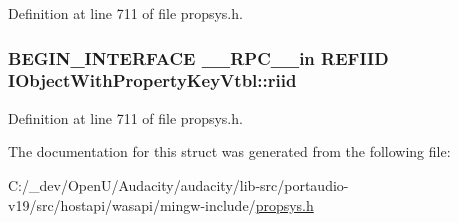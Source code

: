 Definition at line 711 of file propsys.\+h.

\subsubsection[{\texorpdfstring{riid}{riid}}]{\setlength{\rightskip}{0pt plus 5cm}B\+E\+G\+I\+N\+\_\+\+I\+N\+T\+E\+R\+F\+A\+CE {\bf \+\_\+\+\_\+\+R\+P\+C\+\_\+\+\_\+in} {\bf R\+E\+F\+I\+ID} I\+Object\+With\+Property\+Key\+Vtbl\+::riid}\hypertarget{struct_i_object_with_property_key_vtbl_a436f1f22d2a7e3f4847dc96f603b660a}{}\label{struct_i_object_with_property_key_vtbl_a436f1f22d2a7e3f4847dc96f603b660a}


Definition at line 711 of file propsys.\+h.



The documentation for this struct was generated from the following file\+:\begin{DoxyCompactItemize}
\item 
C\+:/\+\_\+dev/\+Open\+U/\+Audacity/audacity/lib-\/src/portaudio-\/v19/src/hostapi/wasapi/mingw-\/include/\hyperlink{propsys_8h}{propsys.\+h}\end{DoxyCompactItemize}
